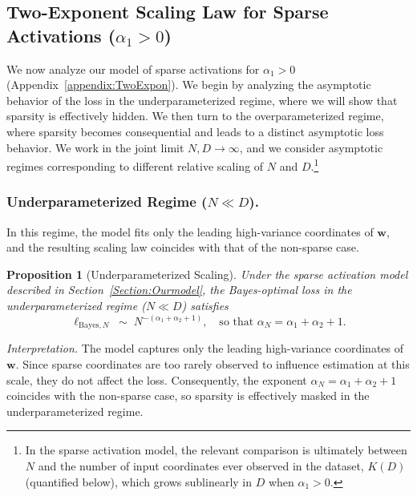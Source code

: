 \documentclass[11pt]{article}
\theoremstyle{plain}
\newtheorem{proposition}[theorem]{Proposition}
\theoremstyle{definition}
\theoremstyle{remark}
\newcommand{\JSCheck}[1]{#1}
\begin{document}
\subsection{Two-Exponent Scaling Law for Sparse Activations ($\alpha_1>0$)}

We now analyze our model of sparse activations for $\alpha_1>0$ (Appendix~\ref{appendix:TwoExpon}). We begin by analyzing the asymptotic behavior of the loss in the underparameterized regime, where we will show that sparsity is effectively hidden. We then turn to the overparameterized regime, where sparsity becomes consequential and leads to a distinct asymptotic loss behavior. We work in the joint limit $N,D\to\infty$, \JSCheck{and we consider asymptotic regimes corresponding to different relative scaling of $N$ and $D$.}\footnote{In the sparse activation model, the relevant comparison is ultimately between $N$ and the  number of input coordinates ever observed in the dataset, $K(D)$ (quantified below), which grows sublinearly in $D$ when $\alpha_1>0$.} 



\subsubsection{Underparameterized Regime (\(N \ll D\)).}

In this regime,  the model fits only the leading high-variance coordinates of  $\mathbf{w}$, and the resulting scaling law coincides with that of the  non-sparse case.

\begin{proposition}[Underparameterized Scaling]
\label{prop:underparam}
Under the sparse activation model described in 
Section~\ref{Section:Ourmodel}, the Bayes-optimal loss in the 
underparameterized regime ($N \ll D$) satisfies
\begin{equation}
\ell_{\mathrm{Bayes}, N}
\;\sim\;
N^{-(\alpha_1 + \alpha_2 + 1)},
\quad
\text{so that }
\alpha_N = \alpha_1 + \alpha_2 + 1.
\label{eq:bayes-N-scaling-prop}
\end{equation}
\end{proposition}

\vspace{-0.5mm}
\noindent\textit{Interpretation.}
\JSCheck{The model captures only the leading high-variance coordinates of \(\mathbf{w}\). Since sparse coordinates are too rarely observed to influence estimation at this scale, they do not affect the loss. Consequently, the exponent $\alpha_N = \alpha_1 + \alpha_2 + 1$ coincides with the non-sparse case, so sparsity is effectively masked in the underparameterized regime.}
\end{document}
